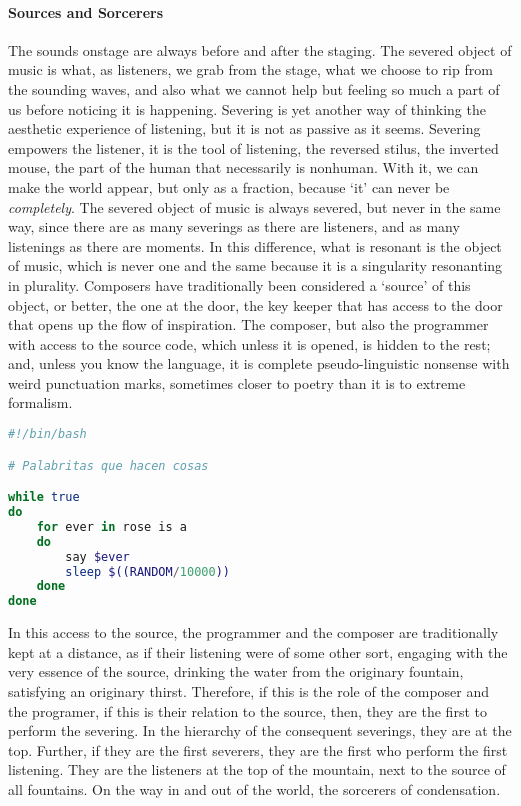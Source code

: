 \paragraph{Sources and Sorcerers}
The sounds onstage are always before and after the staging. The severed object of music is what, as listeners, we grab from the stage, what we choose to rip from the sounding waves, and also what we cannot help but feeling so much a part of us before noticing it is happening. Severing is yet another way of thinking the aesthetic experience of listening, but it is not as passive as it seems. Severing empowers the listener, it is the tool of listening, the reversed stilus, the inverted mouse, the part of the human that necessarily is nonhuman. With it, we can make the world appear, but only as a fraction, because `it' can never be \textit{completely}. The severed object of music is always severed, but never in the same way, since there are as many severings as there are listeners, and as many listenings as there are moments. In this difference, what is resonant is the object of music, which is never one and the same because it is a singularity resonanting in plurality. Composers have traditionally been considered a `source' of this object, or better, the one at the door, the key keeper that has access to the door that opens up the flow of inspiration. The composer, but also the programmer with access to the source code, which unless it is opened, is hidden to the rest; and, unless you know the language, it is complete pseudo-linguistic nonsense with weird punctuation marks, sometimes closer to poetry than it is to extreme formalism. 

\begin{flushleft}
\small
\begin{lstlisting}[caption={Little words that do things},captionpos=b,language=bash,mathescape=false]
#!/bin/bash

# Palabritas que hacen cosas

while true
do
	for ever in rose is a
	do 
		say $ever
		sleep $((RANDOM/10000))
	done
done

\end{lstlisting}
\end{flushleft}

In this access to the source, the programmer and the composer are traditionally kept at a distance, as if their listening were of some other sort, engaging with the very essence of the source, drinking the water from the originary fountain, satisfying an originary thirst. Therefore, if this is the role of the composer and the programer, if this is their relation to the source, then, they are the first to perform the severing. In the hierarchy of the consequent severings, they are at the top. Further, if they are the first severers, they are the first who perform the first listening. They are the listeners at the top of the mountain, next to the source of all fountains. On the way in and out of the world, the sorcerers of condensation.

